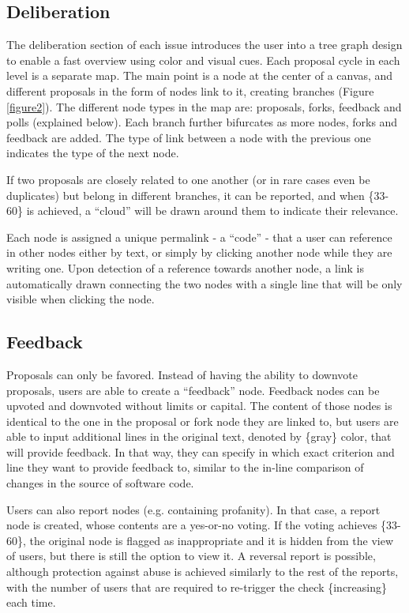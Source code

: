 \documentclass[a4paper,11pt]{article}
\begin{document}
\begin{multicols}{2}
\section{Deliberation} \label{deliberation}

The deliberation section of each issue introduces the user into a tree graph design to enable a fast overview using color and visual cues. Each proposal cycle in each level is a separate map. The main point is a node at the center of a canvas, and different proposals in the form of nodes link to it, creating branches (Figure \ref{figure2}). The different node types in the map are: proposals, forks, feedback and polls (explained below). Each branch further bifurcates as more nodes, forks and feedback are added. The type of link between a node with the previous one indicates the type of the next node.

If two proposals are closely related to one another (or in rare cases even be duplicates) but belong in different branches, it can be reported, and when \{33-60\} is achieved, a “cloud” will be drawn around them to indicate their relevance.

Each node is assigned a unique permalink - a “code” - that a user can reference in other nodes either by text, or simply by clicking another node while they are writing one. Upon detection of a reference towards another node, a link is automatically drawn connecting the two nodes with a single line that will be only visible when clicking the node.

\subsection{Feedback} \label{feedback}

Proposals can only be favored. Instead of having the ability to downvote proposals, users are able to create a “feedback” node. Feedback nodes can be upvoted and downvoted without limits or capital. The content of those nodes is identical to the one in the proposal or fork node they are linked to, but users are able to input additional lines in the original text, denoted by \{gray\} color, that will provide feedback. In that way, they can specify in which exact criterion and line they want to provide feedback to, similar to the in-line comparison of changes in the source of software code.

Users can also report nodes (e.g. containing profanity). In that case, a report node is created, whose contents are a yes-or-no voting. If the voting achieves \{33-60\}, the original node is flagged as inappropriate and it is hidden from the view of users, but there is still the option to view it. A reversal report is possible, although protection against abuse is achieved similarly to the rest of the reports, with the number of users that are required to re-trigger the check \{increasing\} each time.


\end{multicols}
\end{document}
